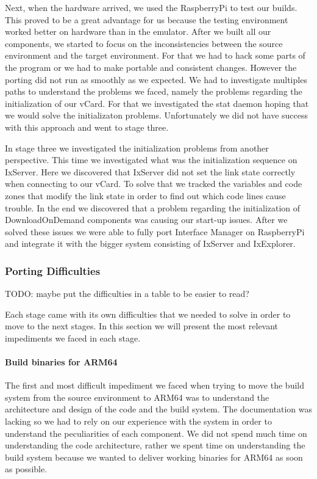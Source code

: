 Next, when the hardware arrived, we used the RaspberryPi to test our builds.
This proved to be a great advantage for us because the testing environment
worked better on hardware than in the emulator. After we built all our
components, we started to focus on the inconsistencies between the source
environment and the target environment. For that we had to hack some parts of
the program or we had to make portable and consistent changes. However the
porting did not run as smoothly as we expected. We had to investigate multiples
paths to understand the problems we faced, namely the problems regarding the
initialization of our vCard. For that we investigated the stat daemon hoping
that we would solve the initializaton problems. Unfortunately we did not have
success with this approach and went to stage three.

In stage three we investigated the initialization problems from another
perspective. This time we investigated what was the initialization sequence on
IxServer. Here we discovered that IxServer did not set the link state correctly
when connecting to our vCard. To solve that we tracked the variables and code
zones that modify the link state in order to find out which code lines cause
trouble. In the end we discovered that a problem regarding the initialization
of DownloadOnDemand components was causing our start-up issues. After we solved
these issues we were able to fully port Interface Manager on RaspberryPi and
integrate it with the bigger system consisting of IxServer and IxExplorer.

\subsubsection{Porting Difficulties}

TODO: maybe put the difficulties in a table to be easier to read?

Each stage came with its own difficulties that we needed to solve in order to
move to the next stages. In this section we will present the most relevant
impediments we faced in each stage.

\paragraph{Build binaries for ARM64}

The first and most difficult impediment we faced when trying to move the build
system from the source environment to ARM64 was to understand the architecture
and design of the code and the build system. The documentation was lacking so
we had to rely on our experience with the system in order to understand the
peculiarities of each component. We did not spend much time on understanding the
code architecture, rather we spent time on understanding the build system
because we wanted to deliver working binaries for ARM64 as soon as possible.

